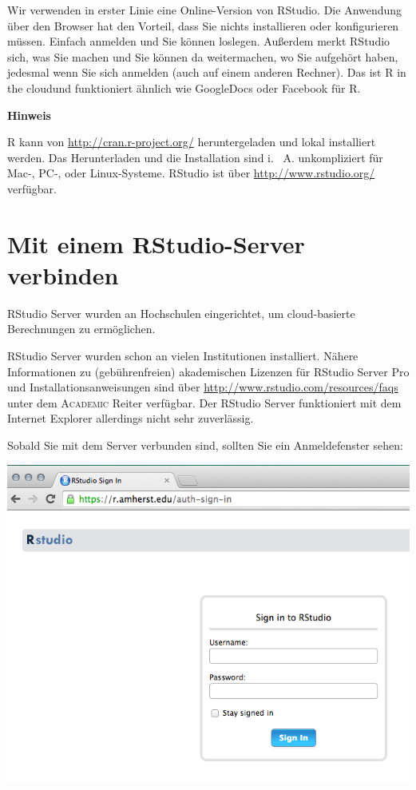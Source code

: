 \documentclass[
  ngerman,
]{scrbook}
\newenvironment{hinweis}[1]
  {
  \begin{itemize}
  \renewcommand{\labelitemi}{
    \raisebox{1.8\height}[0pt][0pt]{
      {\setkeys{Gin}{width=7em,keepaspectratio}
        {\Large \textcolor{dark-fom-green}\faHandORight}}
        }
  }
  \begin{blackbox}
        \bgroup\color{dark-fom-green}
          {\textbf{Hinweis}}
        \egroup
  \item
  }
  {
  \end{blackbox}
  \end{itemize}
  }
\newenvironment{note}[1]
  {
  \begin{itemize}
  \renewcommand{\labelitemi}{
    \raisebox{-.01\height}[0pt][0pt]{
      {\setkeys{Gin}{width=7em,keepaspectratio}
        {\normalsize \textcolor{dark-fom-green}\faHashtag}}
        }
  }
  \begin{blackbox}
   \item
    }
    {
  \end{blackbox}
  \end{itemize}
  }
\begin{document}
Wir verwenden in erster Linie eine Online-Version von \textsf{RStudio}. Die Anwendung über den Browser hat den Vorteil, dass Sie nichts installieren oder konfigurieren müssen. Einfach anmelden und Sie können loslegen. Außerdem \glqq merkt\grqq  \textsf{ RStudio} sich, was Sie machen und Sie können da weitermachen, wo Sie aufgehört haben, jedesmal wenn Sie sich anmelden (auch auf einem anderen Rechner). Das ist \glqq\textsf{R} in the cloud\grqq und funktioniert ähnlich wie GoogleDocs oder Facebook für \textsf{R}.

\begin{hinweis}
\textsf{R} kann von \url{http://cran.r-project.org/} heruntergeladen und lokal installiert werden. Das Herunterladen und die Installation sind i. ~A. unkompliziert für Mac-, PC-, oder Linux-Systeme. \textsf{RStudio} ist über \url{http://www.rstudio.org/} verfügbar.

\end{hinweis}

\hypertarget{mit-einem-rstudio-server-verbinden}{%
\section{Mit einem RStudio-Server verbinden}\label{mit-einem-rstudio-server-verbinden}}

\textsf{RStudio} Server wurden an Hochschulen eingerichtet, um cloud-basierte Berechnungen zu ermöglichen.

\begin{note}{note}
\textsf{RStudio} Server wurden schon an vielen Institutionen installiert. Nähere Informationen zu (gebührenfreien) akademischen Lizenzen für \textsf{RStudio} Server Pro und Installationsanweisungen sind über \url{http://www.rstudio.com/resources/faqs} unter dem \textsc{Academic} Reiter verfügbar.
Der \textsf{RStudio} Server funktioniert mit dem Internet Explorer allerdings nicht sehr zuverlässig.

\end{note}

Sobald Sie mit dem Server verbunden sind, sollten Sie ein Anmeldefenster sehen:

\begin{center}\includegraphics[width=0.5\linewidth]{images/rstudio-login} \end{center}
\end{document}
